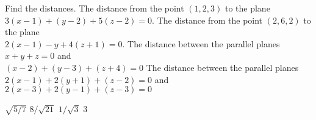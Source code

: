 
\begin{Exercise}[
name={},
title={}, 
difficulty=0,
origin={\cite{GHC}}]
Find the distances.
\Question The distance from the point $(1,2,3)$ to the plane\\
$3(x-1)+(y-2)+5(z-2)=0$.
\Question The distance from the point $(2,6,2)$ to the plane\\
$2(x-1)-y+4(z+1)=0$.
\Question The distance between the parallel planes\\
$x+y+z=0$ and \\
$(x-2)+(y-3)+(z+4)=0$
\Question The distance between the parallel planes\\
$2(x-1)+2(y+1)+(z-2)=0$ and \\
$2(x-3)+2(y-1)+(z-3)=0$

\end{Exercise}

\begin{Answer}
\Question $\sqrt{5/7}$
\Question $8/\sqrt{21}$
\Question $1/\sqrt{3}$
\Question $3$

\end{Answer}
